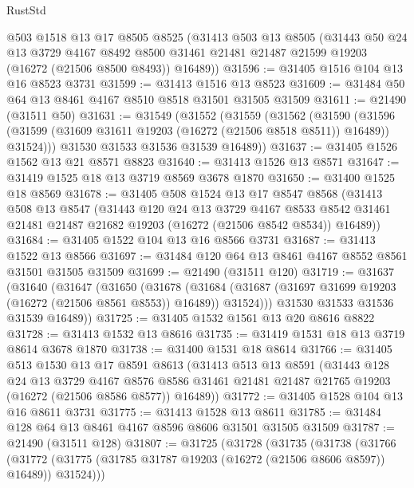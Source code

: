 \begin{lexlean}{RustStd}
\begin{coremodule}
    @503
    @1518
    @13
    @17
    @8505
    @8525
    (@31413
      @503
      @13
      @8505
      (@31443
        @50
        @24
        @13
        @3729
        @4167
        @8492
        @8500
        @31461
        @21481
        @21487
        @21599
        @19203
        (@16272 (@21506 @8500 @8493))
        @16489))
@31596 := @31405 @1516 @104 @13 @16 @8523 @3731
@31599 := @31413 @1516 @13 @8523
@31609 := @31484 @50 @64 @13 @8461 @4167 @8510 @8518 @31501 @31505 @31509
@31611 := @21490 (@31511 @50)
@31631 := @31549
    (@31552
      (@31559
        (@31562
          (@31590
            (@31596 (@31599 (@31609 @31611 @19203 (@16272 (@21506 @8518 @8511)) @16489)) @31524)))
        @31530
        @31533
        @31536
        @31539
        @16489))
@31637 := @31405 @1526 @1562 @13 @21 @8571 @8823
@31640 := @31413 @1526 @13 @8571
@31647 := @31419 @1525 @18 @13 @3719 @8569 @3678 @1870
@31650 := @31400 @1525 @18 @8569
@31678 := @31405
    @508
    @1524
    @13
    @17
    @8547
    @8568
    (@31413
      @508
      @13
      @8547
      (@31443
        @120
        @24
        @13
        @3729
        @4167
        @8533
        @8542
        @31461
        @21481
        @21487
        @21682
        @19203
        (@16272 (@21506 @8542 @8534))
        @16489))
@31684 := @31405 @1522 @104 @13 @16 @8566 @3731
@31687 := @31413 @1522 @13 @8566
@31697 := @31484 @120 @64 @13 @8461 @4167 @8552 @8561 @31501 @31505 @31509
@31699 := @21490 (@31511 @120)
@31719 := @31637
    (@31640
      (@31647
        (@31650
          (@31678
            (@31684 (@31687 (@31697 @31699 @19203 (@16272 (@21506 @8561 @8553)) @16489)) @31524)))
        @31530
        @31533
        @31536
        @31539
        @16489))
@31725 := @31405 @1532 @1561 @13 @20 @8616 @8822
@31728 := @31413 @1532 @13 @8616
@31735 := @31419 @1531 @18 @13 @3719 @8614 @3678 @1870
@31738 := @31400 @1531 @18 @8614
@31766 := @31405
    @513
    @1530
    @13
    @17
    @8591
    @8613
    (@31413
      @513
      @13
      @8591
      (@31443
        @128
        @24
        @13
        @3729
        @4167
        @8576
        @8586
        @31461
        @21481
        @21487
        @21765
        @19203
        (@16272 (@21506 @8586 @8577))
        @16489))
@31772 := @31405 @1528 @104 @13 @16 @8611 @3731
@31775 := @31413 @1528 @13 @8611
@31785 := @31484 @128 @64 @13 @8461 @4167 @8596 @8606 @31501 @31505 @31509
@31787 := @21490 (@31511 @128)
@31807 := @31725
    (@31728
      (@31735
        (@31738
          (@31766
            (@31772 (@31775 (@31785 @31787 @19203 (@16272 (@21506 @8606 @8597)) @16489)) @31524)))

\end{coremodule}
\end{lexlean}
